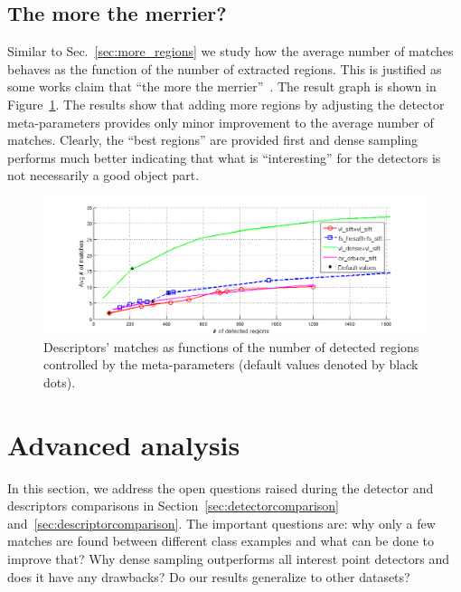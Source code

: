\documentclass[10pt,journal,cspaper,compsoc]{IEEEtran}
\begin{document}
\subsection{The more the merrier?\label{sec:more_matches}}
Similar to Sec.~\ref{sec:more_regions} we study how the average number
of matches behaves as the function of the number of extracted regions.
This is justified as some works claim that
``the more the merrier''~\cite{NowJurTri:2006}. The result graph is shown in
Figure~\ref{fig:more_matches}. The results show that adding more regions
by adjusting the detector meta-parameters provides only minor
improvement to the average number of matches. Clearly, the ``best regions''
are provided first and dense sampling performs much better indicating
that what is ``interesting'' for the detectors is not necessarily a good
object part.
\begin{figure}[h]
  \begin{center}
    \includegraphics[trim=60 0 40 0, clip=true, width=0.99\linewidth]{resources/antti_results/DetectingMoreRegions/DescriptorPlot.png}
    \caption{Descriptors' matches as functions of the number
      of detected regions controlled by the meta-parameters (default values denoted by black dots).
      \label{fig:more_matches}}
  \end{center}
\end{figure}


\section{Advanced analysis}
%
In this section, we address the open questions raised during the
detector and descriptors comparisons in Section~\ref{sec:detectorcomparison}
and~\ref{sec:descriptorcomparison}. The important
questions are: why only a few matches are found between different class
examples and what can be done to improve that? Why dense sampling outperforms
all interest point detectors and does it have any drawbacks? Do our results
generalize to other datasets?
\end{document}

